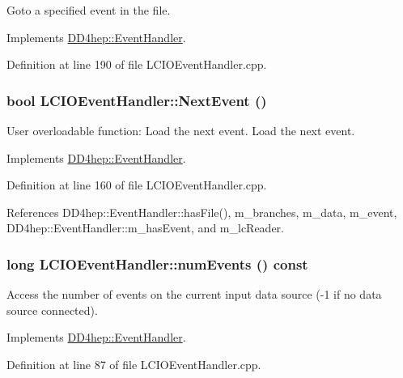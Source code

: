 Goto a specified event in the file. 

Implements \hyperlink{class_d_d4hep_1_1_event_handler_a09c40b0b753455c1e3df7c561ff6b069}{DD4hep::EventHandler}.

Definition at line 190 of file LCIOEventHandler.cpp.\hypertarget{class_d_d4hep_1_1_l_c_i_o_event_handler_a14966ef5f33d58b1f0f3b952a334d48f}{
\subsubsection[{NextEvent}]{\setlength{\rightskip}{0pt plus 5cm}bool LCIOEventHandler::NextEvent ()}}
\label{class_d_d4hep_1_1_l_c_i_o_event_handler_a14966ef5f33d58b1f0f3b952a334d48f}


User overloadable function: Load the next event. Load the next event. 

Implements \hyperlink{class_d_d4hep_1_1_event_handler_ac2360791d3a44f4cef0987f9a7ec51ce}{DD4hep::EventHandler}.

Definition at line 160 of file LCIOEventHandler.cpp.

References DD4hep::EventHandler::hasFile(), m\_\-branches, m\_\-data, m\_\-event, DD4hep::EventHandler::m\_\-hasEvent, and m\_\-lcReader.\hypertarget{class_d_d4hep_1_1_l_c_i_o_event_handler_a922a7d225b2e0944c850965f9983758f}{
\subsubsection[{numEvents}]{\setlength{\rightskip}{0pt plus 5cm}long LCIOEventHandler::numEvents () const}}
\label{class_d_d4hep_1_1_l_c_i_o_event_handler_a922a7d225b2e0944c850965f9983758f}


Access the number of events on the current input data source (-\/1 if no data source connected). 

Implements \hyperlink{class_d_d4hep_1_1_event_handler_a005436bba029439b513645485e3c0ff5}{DD4hep::EventHandler}.

Definition at line 87 of file LCIOEventHandler.cpp.

